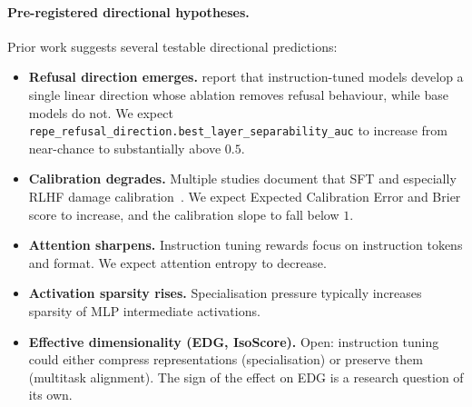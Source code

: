 \documentclass[preprint]{neurips_2025}
\begin{document}
\paragraph{Pre-registered directional hypotheses.}
Prior work suggests several testable directional predictions:
\begin{itemize}
  \item \textbf{Refusal direction emerges.} \citet{arditi2024refusal} report that instruction-tuned models develop a single linear direction whose ablation removes refusal behaviour, while base models do not. We expect \texttt{repe\_refusal\_direction.best\_layer\_separability\_auc} to increase from near-chance to substantially above $0.5$.
  \item \textbf{Calibration degrades.} Multiple studies document that SFT and especially RLHF damage calibration~\citep{tian2023just,openai2023gpt4}. We expect Expected Calibration Error and Brier score to increase, and the calibration slope to fall below $1$.
  \item \textbf{Attention sharpens.} Instruction tuning rewards focus on instruction tokens and format. We expect attention entropy to decrease.
  \item \textbf{Activation sparsity rises.} Specialisation pressure typically increases sparsity of MLP intermediate activations.
  \item \textbf{Effective dimensionality (EDG, IsoScore).} Open: instruction tuning could either compress representations (specialisation) or preserve them (multitask alignment). The sign of the effect on EDG is a research question of its own.
\end{itemize}
\end{document}
